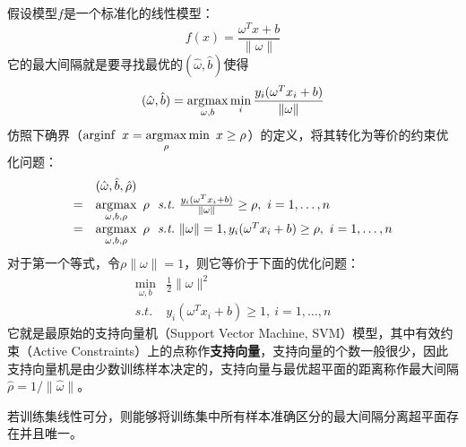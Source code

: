 假设模型$f$是一个标准化的线性模型：
\begin{equation}
    f(x) = \frac{\omega^T x + b}{\|\omega\|}
\end{equation}
它的最大间隔就是要寻找最优的$(\hat \omega,\hat b)$使得
\begin{equation}
    (\hat \omega,\hat b) = \operatorname*{\mathrm{\arg\!\max}}\limits_{\omega,b} \min\limits_i \frac{y_i(\omega^T x_i + b)}{\|\omega\|}
\end{equation}
仿照下确界（$\operatorname*{\mathrm{\arg\!\inf}}~x=\operatorname*{\mathrm{\arg\!\max}}\limits_{\rho}\min~x\ge \rho$）的定义，将其转化为等价的约束优化问题：
\begin{equation}
    \begin{array}{ll}
       & (\hat \omega,\hat b,\hat\rho) \\
     = & \operatorname*{\mathrm{\arg\!\max}}\limits_{\omega,b,\rho}~\rho~~\textit{s.t.}~\frac{y_i(\omega^T x_i + b)}{\|\omega\|} \ge \rho, ~i=1,\ldots,n \\
     = & \operatorname*{\mathrm{\arg\!\max}}\limits_{\omega,b,\rho}~\rho~~\textit{s.t.}~\|\omega\|=1,y_i(\omega^T x_i + b) \ge \rho, ~i=1,\ldots,n
    \end{array}
\end{equation}
对于第一个等式，令$\rho\|\omega\|=1$，则它等价于下面的优化问题：
\begin{equation}\label{eq:lsvm}
    \begin{array}{ll}
      \min\limits_{\omega,b} & \frac{1}{2}\|\omega\|^2 \\
      \textit{s.t.} & y_i(\omega^T x_i + b) \ge 1,~i=1,\ldots,n
    \end{array}
\end{equation}
它就是最原始的支持向量机（Support Vector Machine, SVM）模型，其中有效约束（Active Constraints）上的点称作\textbf{支持向量}，支持向量的个数一般很少，因此支持向量机是由少数训练样本决定的，支持向量与最优超平面的距离称作最大间隔$\hat\rho=1/\|\hat\omega\|$。
\begin{theorem}[最大间隔分离超平面的唯一性]
若训练集线性可分，则能够将训练集中所有样本准确区分的最大间隔分离超平面存在并且唯一。
\end{theorem}
